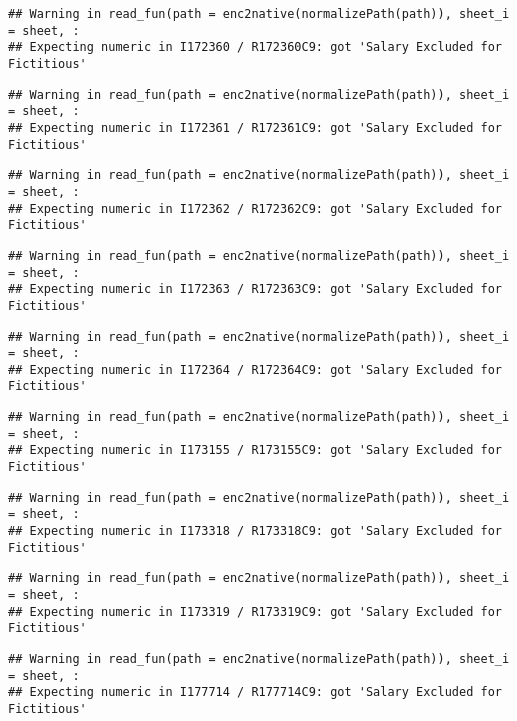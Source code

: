 \documentclass[
]{article}
\begin{document}
\begin{verbatim}
## Warning in read_fun(path = enc2native(normalizePath(path)), sheet_i = sheet, :
## Expecting numeric in I172360 / R172360C9: got 'Salary Excluded for Fictitious'
\end{verbatim}

\begin{verbatim}
## Warning in read_fun(path = enc2native(normalizePath(path)), sheet_i = sheet, :
## Expecting numeric in I172361 / R172361C9: got 'Salary Excluded for Fictitious'
\end{verbatim}

\begin{verbatim}
## Warning in read_fun(path = enc2native(normalizePath(path)), sheet_i = sheet, :
## Expecting numeric in I172362 / R172362C9: got 'Salary Excluded for Fictitious'
\end{verbatim}

\begin{verbatim}
## Warning in read_fun(path = enc2native(normalizePath(path)), sheet_i = sheet, :
## Expecting numeric in I172363 / R172363C9: got 'Salary Excluded for Fictitious'
\end{verbatim}

\begin{verbatim}
## Warning in read_fun(path = enc2native(normalizePath(path)), sheet_i = sheet, :
## Expecting numeric in I172364 / R172364C9: got 'Salary Excluded for Fictitious'
\end{verbatim}

\begin{verbatim}
## Warning in read_fun(path = enc2native(normalizePath(path)), sheet_i = sheet, :
## Expecting numeric in I173155 / R173155C9: got 'Salary Excluded for Fictitious'
\end{verbatim}

\begin{verbatim}
## Warning in read_fun(path = enc2native(normalizePath(path)), sheet_i = sheet, :
## Expecting numeric in I173318 / R173318C9: got 'Salary Excluded for Fictitious'
\end{verbatim}

\begin{verbatim}
## Warning in read_fun(path = enc2native(normalizePath(path)), sheet_i = sheet, :
## Expecting numeric in I173319 / R173319C9: got 'Salary Excluded for Fictitious'
\end{verbatim}

\begin{verbatim}
## Warning in read_fun(path = enc2native(normalizePath(path)), sheet_i = sheet, :
## Expecting numeric in I177714 / R177714C9: got 'Salary Excluded for Fictitious'
\end{verbatim}
\end{document}
